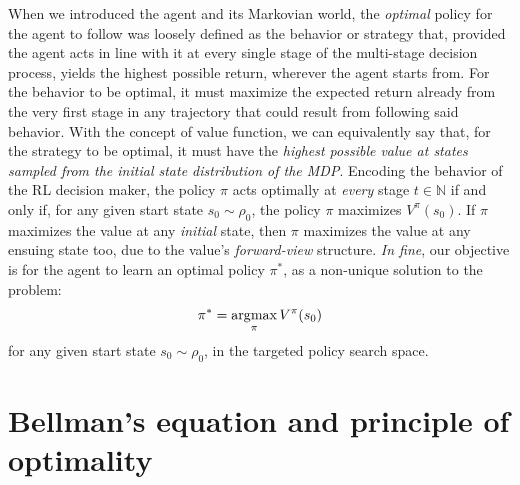 When we introduced the agent and its Markovian world, the \emph{optimal} policy for the agent to follow was loosely
defined as the behavior or strategy that, provided the agent acts in line with it at every single stage of the
multi-stage decision process, yields the highest possible return, wherever the agent starts from.
For the behavior to be optimal, it must maximize the expected return already from the very first stage in any
trajectory that could result from following said behavior.
With the concept of value function, we can equivalently say that,
for the strategy to be optimal, it must have the \emph{highest possible value at states sampled from
the initial state distribution of the MDP}.
Encoding the behavior of the RL decision maker,
the policy $\pi$ acts optimally at \emph{every} stage $t \in \mathbb{N}$ if and only if,
for any given start state $s_0 \sim \rho_0$, the policy $\pi$ maximizes $V^\pi (s_0)$.
If $\pi$ maximizes the value at any \emph{initial} state, then
$\pi$ maximizes the value at any ensuing state too,
due to the value's \textit{forward-view} structure.
\textit{In fine},
our objective is for the agent to learn an optimal policy $\pi^*$, as a non-unique solution to the problem:
\begin{align}
\pi^* = \operatorname*{\arg\!\max}_\pi V^\pi(s_0)
\end{align}
for any given start state $s_0 \sim \rho_0$,
in the targeted policy search space.

\section{Bellman's equation and principle of optimality}

